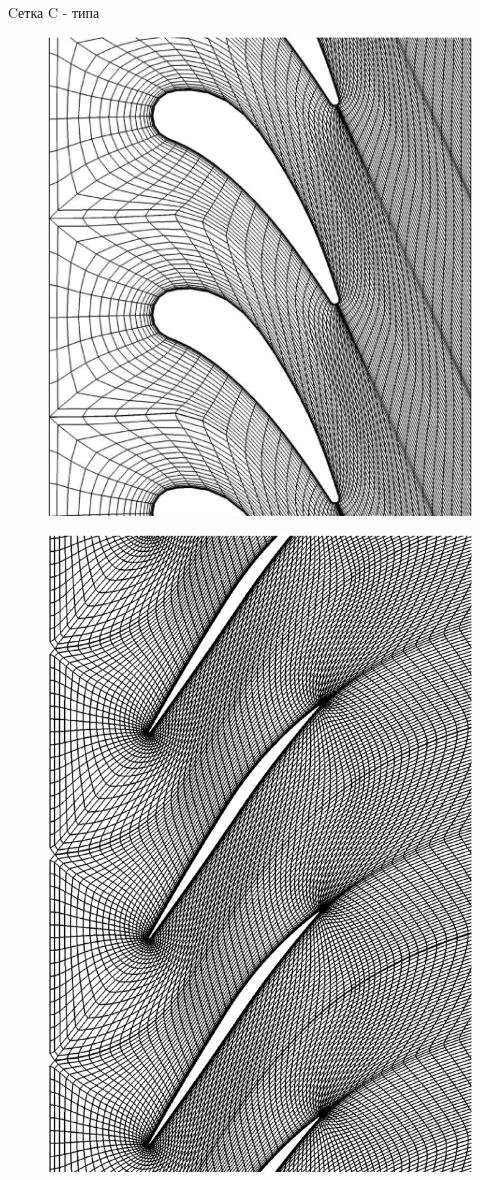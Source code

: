 \documentclass[10pt,xcolor=pst,aspectratio=169]{beamer}
\begin{document}
\begin{frame}{Cетка C - типа}

	\transdissolve[duration=0.1]
	\justifying
	\large

	\begin{minipage}{0.49\textwidth}
		\begin{center}
			\begin{figure}
				\includegraphics[width=0.8\linewidth]{C_type_grid_example_2.eps}
			\end{figure}
		\end{center}
	\end{minipage}
	\hfill
	\begin{minipage}{0.49\textwidth}
		\begin{center}
			\begin{figure}
				\includegraphics[width=0.6\linewidth]{C_type_grid_example_4.eps}
			\end{figure}
		\end{center}
	\end{minipage}

\end{frame}
\end{document}
